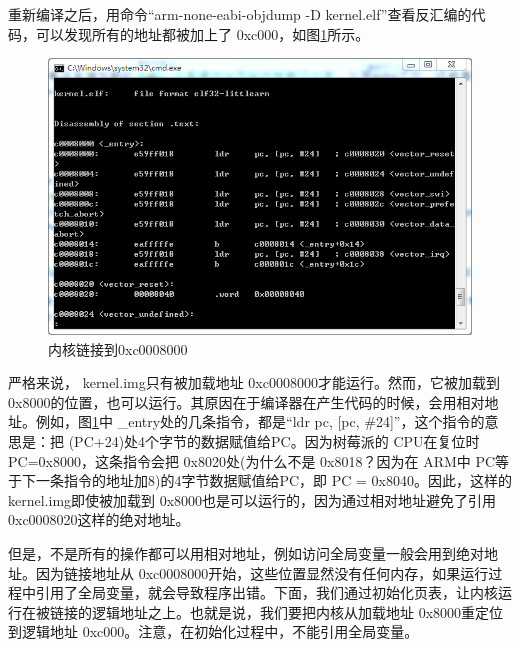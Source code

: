 \documentclass[main.tex]{subfiles}
\begin{document}
\begin{CJK*}{UTF8}{song}
\begin{code}
\label{code:4-2}
\inputminted[firstline=79,lastline=120,linenos,numbersep=5pt,frame=lines,framesep=2mm]{gas}{src/chapter04/kernel/entry.S}
\end{code}

重新编译之后，用命令“arm-\-none-\-eabi-\-objdump -D kernel.elf”查看反汇编的代码，可以发现所有的地址都被加上了 0xc000，如图\ref{figure:4-5}所示。

\begin{figure}[htp]
\centering
\includegraphics[scale=0.5]{figures/4-5}
\caption{内核链接到0xc0008000}
\label{figure:4-5}
\end{figure}

严格来说， kernel.img只有被加载地址 0xc000\-8000才能运行。然而，它被加载到 0x8000的位置，也可以运行。其原因在于编译器在产生代码的时候，会用相对地址。例如，图\ref{figure:4-5}中 \_entry处的几条指令，都是“ldr pc, [pc, \#24]”，这个指令的意思是：把 (PC+24)处4个字节的数据赋值给PC。因为树莓派的 CPU在复位时 PC=0x8000，这条指令会把 0x8020处(为什么不是 0x8018？因为在 ARM中 PC等于下一条指令的地址加8)的4字节数据赋值给PC，即 PC = 0x8040。因此，这样的 kernel.img即使被加载到 0x8000也是可以运行的，因为通过相对地址避免了引用 0xc000\-8020这样的绝对地址。

\par
但是，不是所有的操作都可以用相对地址，例如访问全局变量一般会用到绝对地址。因为链接地址从 0xc000\-8000开始，这些位置显然没有任何内存，如果运行过程中引用了全局变量，就会导致程序出错。下面，我们通过初始化页表，让内核运行在被链接的逻辑地址之上。也就是说，我们要把内核从加载地址 0x8000重定位到逻辑地址 0xc000。注意，在初始化过程中，不能引用全局变量。


\end{CJK*}
\end{document}
